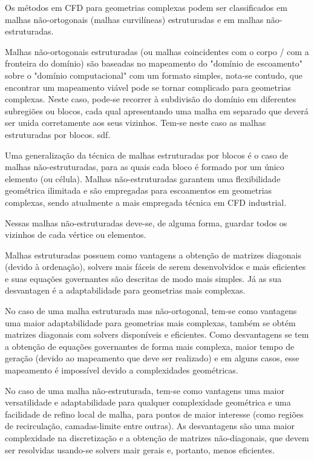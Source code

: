 Os métodos em CFD para geometrias complexas podem ser classificados em malhas não-ortogonais (malhas curvilíneas) estruturadas e em malhas não-estruturadas.

Malhas não-ortogonais estruturadas (ou malhas coincidentes com o corpo / com a fronteira do domínio) são baseadas no mapeamento do "domínio de escoamento" sobre o "domínio computacional" com um formato simples, nota-se contudo, que encontrar um mapeamento viável pode se tornar complicado para geometrias complexas. Neste caso, pode-se recorrer à subdivisão do domínio em diferentes subregiões ou blocos, cada qual apresentando uma malha em separado que deverá ser unida corretamente aos seus vizinhos. Tem-se neste caso as malhas estruturadas por blocos. sdf.

Uma generalização da técnica de malhas estruturadas por blocos é o caso de malhas não-estruturadas, para as quais cada bloco é formado por um único elemento (ou célula). Malhas não-estruturadas garantem uma flexibilidade geométrica ilimitada e são empregadas para escoamentos em geometrias complexas, sendo atualmente a mais empregada técnica em CFD industrial.

Nessas malhas não-estruturadas deve-se, de alguma forma, guardar todos os vizinhos de cada vértice ou elementos. \cite{Shewchuk1992}

Malhas estruturadas possuem como vantagens a obtenção de matrizes diagonais (devido à ordenação), solvers mais fáceis de serem desenvolvidos e mais eficientes e suas equações governantes são descritas de modo mais simples. Já as sua desvantagen é a adaptabilidade para geometrias mais complexas.

No caso de uma malha estruturada mas não-ortogonal, tem-se como vantagens uma maior adaptabilidade para geometrias mais complexas, também se obtém matrizes diagonais com solvers disponíveis e eficientes. Como desvantagens se tem a obtenção de equações governantes de forma mais complexa, maior tempo de geração (devido ao mapeamento que deve ser realizado) e em alguns casos, esse mapeamento é impossível devido a complexidades geométricas.

No caso de uma malha não-estruturada, tem-se como vantagens uma maior versatilidade e adaptabilidade para qualquer complexidade geométrica e uma facilidade de refino local de malha, para pontos de maior interesse (como regiões de recirculação, camadas-limite entre outras). As desvantagens são uma maior complexidade na discretização e a obtenção de matrizes não-diagonais, que devem ser resolvidas usando-se solvers mair gerais e, portanto, menos eficientes.

